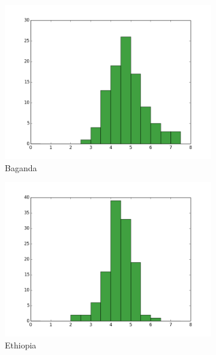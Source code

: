 \begin{figure}[htp]
\begin{subfigure}{.3\textwidth}
  \centering
  \includegraphics[width=1.0\linewidth]{Chapter2/fig/coverage_baganda.png}
  \caption{Baganda}
\end{subfigure}
\begin{subfigure}{.3\textwidth}
  \centering
  \includegraphics[width=1.0\linewidth]{Chapter2/fig/coverage_ethiopia.png}
  \caption{Ethiopia}
\end{subfigure}
\begin{subfigure}{.3\textwidth}
  \centering

\end{subfigure}
\end{figure}
